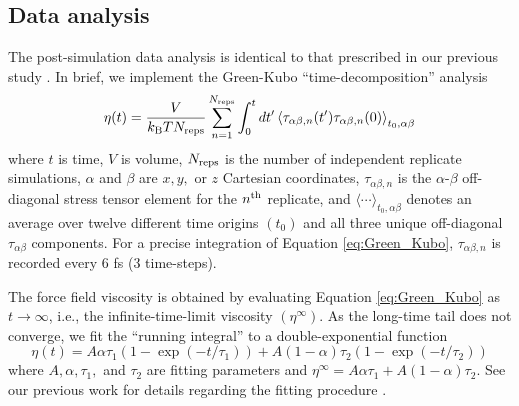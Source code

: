 \documentclass[preprint,review,12pt]{elsarticle}
\begin{document}
	\subsection{Data analysis}
	
	The post-simulation data analysis is identical to that prescribed in our previous study \cite{Postdoc_3}. In brief, we implement the Green-Kubo ``time-decomposition'' analysis \cite{Maginn2018,Zhang2015}
	\begin{equation} \label{eq:Green_Kubo}
	\eta(t) = \frac{V}{k_{\rm B} T N_{\rm reps}} \sum_{n=1}^{N_{\rm reps}} \int_{0}^{t}dt'\left\langle \tau_{\alpha\beta,n}(t') \tau_{\alpha\beta,n}(0)\right\rangle_{t_0,\alpha\beta}
	\end{equation} 
	where $t$ is time, $V$ is volume, $N_{\rm reps}$ is the number of independent replicate simulations, $\alpha$ and $\beta$ are $x, y, $ or $z$ Cartesian coordinates, $\tau_{\alpha\beta,n}$ is the $\alpha$-$\beta$ off-diagonal stress tensor element for the $n^{\rm th}$ replicate, and $\langle \cdots \rangle_{t_0,\alpha\beta}$ denotes an average over twelve different time origins $(t_0)$ and all three unique off-diagonal $\tau_{\alpha\beta}$ components. For a precise integration of Equation \ref{eq:Green_Kubo}, $\tau_{\alpha\beta,n}$ is recorded every 6 fs (3 time-steps). 
	
	
	
	The force field viscosity is obtained by evaluating Equation \ref{eq:Green_Kubo} as $t \rightarrow \infty$, i.e., the infinite-time-limit viscosity $(\eta^\infty)$. As the long-time tail does not converge, we fit the ``running integral'' to a double-exponential function
	\begin{equation} \label{eq: Double exponential}
	\eta(t) = A \alpha \tau_1 \left(1-\exp{(-t/\tau_1)}\right) + A (1-\alpha) \tau_2 \left(1-\exp{(-t/\tau_2)}\right)
	\end{equation}
	where $A, \alpha, \tau_1, $ and $\tau_2$ are fitting parameters and $\eta^\infty = A \alpha \tau_1 + A (1-\alpha) \tau_2$. See our previous work for details regarding the fitting procedure \cite{Postdoc_3}. 
	
	 
\end{document}
